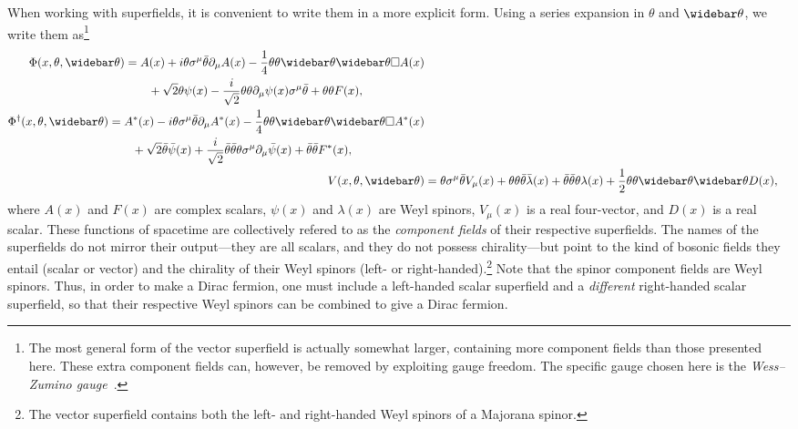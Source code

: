 When working with superfields, it is convenient to write them in a more explicit form.
Using a series expansion in $\theta$ and $\thetabar$, we write them as\footnote{The most general form of the vector superfield is actually somewhat larger, containing more component fields than those presented here. These extra component fields can, however, be removed by exploiting gauge freedom. The specific gauge chosen here is the \emph{Wess--Zumino gauge}~\cite{Tong:susy}.}
\begin{subequations}
\label{eq:superfields}
\begin{align}
    \begin{split}
        \Phi(x,\theta,\thetabar) &=
        A(x)
        + i\theta\sigma^\mu\bar\theta\partial_\mu A(x)
        - \frac{1}{4}\thetafour\Box A(x)
        \\ &\qquad
        + \sqrt{2}\theta\psi(x)
        - \frac{i}{\sqrt{2}}\theta\theta\partial_\mu\psi(x)\sigma^\mu\bar\theta
        + \theta\theta F(x),
    \end{split}
    \label{eq:scalar_LH}
    \\
    \begin{split}
        \Phi^\dagger(x,\theta,\thetabar) &=
        A^*(x)
        - i\theta\sigma^\mu\bar\theta\partial_\mu A^*(x)
        - \frac{1}{4}\thetafour\Box A^*(x)
        \\ &\qquad
        + \sqrt{2}\bar\theta\bar\psi(x)
        + \frac{i}{\sqrt{2}}\bar\theta\bar\theta\theta{\sigma^\mu}\partial_\mu\bar\psi(x)
        + \bar\theta\bar\theta F^*(x),
    \end{split}
    \label{eq:scalar_RH}
    \\
    V(x,\theta,\thetabar) &=
    \theta\sigma^\mu\bar\theta V_\mu(x)
    + \theta\theta\bar\theta\bar\lambda(x)
    + \bar\theta\bar\theta\theta\lambda(x)
    + \frac{1}{2}\thetafour D(x),
    \label{eq:vector_WZ}
\end{align}
\end{subequations}
where $A(x)$ and $F(x)$ are complex scalars, $\psi(x)$ and $\lambda(x)$ are Weyl spinors, $V_\mu(x)$ is a real four-vector, and $D(x)$ is a real scalar. These functions of spacetime are collectively refered to as the \emph{component fields} of their respective superfields.
The names of the superfields do not mirror their output---they are all scalars, and they do not possess chirality---but point to the kind of bosonic fields they entail (scalar or vector) and the chirality of their Weyl spinors (left- or right-handed).\footnote{The vector superfield contains both the left- and right-handed Weyl spinors of a Majorana spinor.}
Note that the spinor component fields are Weyl spinors. Thus, in order to make a Dirac fermion, one must include a left-handed scalar superfield and a \emph{different} right-handed scalar superfield, so that their respective Weyl spinors can be combined to give a Dirac fermion.



